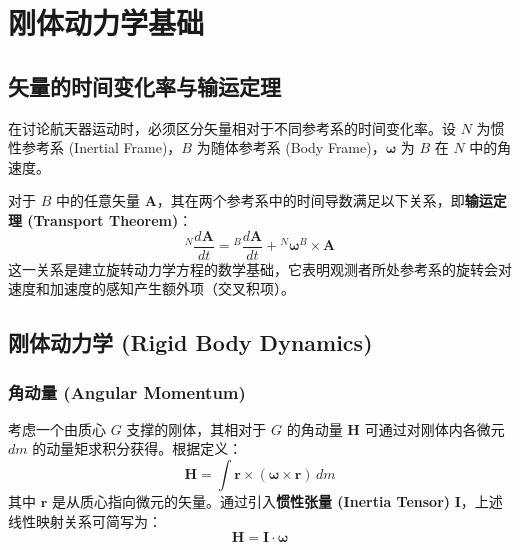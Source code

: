 \documentclass[11pt,a4paper]{book}
\begin{document}
\chapter{刚体动力学基础}

\section{矢量的时间变化率与输运定理}
在讨论航天器运动时，必须区分矢量相对于不同参考系的时间变化率。设 $N$ 为惯性参考系 (Inertial Frame)，$B$ 为随体参考系 (Body Frame)，$\bm{\omega}$ 为 $B$ 在 $N$ 中的角速度。

对于 $B$ 中的任意矢量 $\bm{A}$，其在两个参考系中的时间导数满足以下关系，即\textbf{输运定理 (Transport Theorem)}：
\begin{equation}
    {}^N \frac{d\bm{A}}{dt} = {}^B \frac{d\bm{A}}{dt} + {}^N\bm{\omega}^B \times \bm{A}
\end{equation}
这一关系是建立旋转动力学方程的数学基础，它表明观测者所处参考系的旋转会对速度和加速度的感知产生额外项（交叉积项）。



\section{刚体动力学 (Rigid Body Dynamics)}

\subsection{角动量 (Angular Momentum)}
考虑一个由质心 $G$ 支撑的刚体，其相对于 $G$ 的角动量 $\bm{H}$ 可通过对刚体内各微元 $dm$ 的动量矩求积分获得。根据定义：
\begin{equation}
    \bm{H} = \int \bm{r} \times (\bm{\omega} \times \bm{r}) \, dm
\end{equation}
其中 $\bm{r}$ 是从质心指向微元的矢量。通过引入\textbf{惯性张量 (Inertia Tensor)} $\mathbf{I}$，上述线性映射关系可简写为：
\begin{equation}
    \bm{H} = \mathbf{I} \cdot \bm{\omega}
\end{equation}
\end{document}
